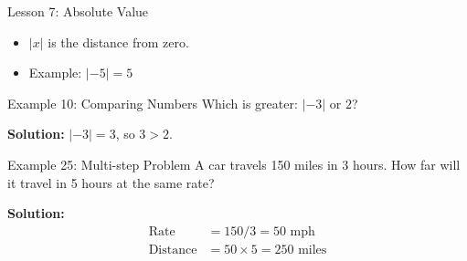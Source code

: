 \documentclass{beamer}
\begin{document}

\begin{frame}{Lesson 7: Absolute Value}
\begin{itemize}
    \item $|x|$ is the distance from zero.
    \item Example: $|-5| = 5$
\end{itemize}
\end{frame}

\begin{frame}{Example 10: Comparing Numbers}
Which is greater: $|-3|$ or $2$?

\textbf{Solution:} $|-3| = 3$, so $3 > 2$.
\end{frame}


\begin{frame}{Example 25: Multi-step Problem}
A car travels 150 miles in 3 hours. How far will it travel in 5 hours at the same rate?

\textbf{Solution:}
\begin{align*}
\text{Rate} &= 150/3 = 50 \text{ mph} \\
\text{Distance} &= 50 \times 5 = 250 \text{ miles}
\end{align*}
\end{frame}
\end{document}
